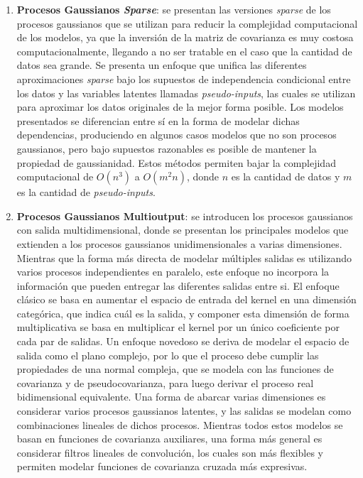 \begin{enumerate}
	\item \textbf{Procesos Gaussianos \textit{Sparse}}: se presentan las versiones \emph{sparse} de los procesos gaussianos que se utilizan para reducir la complejidad computacional de los modelos, ya que la inversión de la matriz de covarianza es muy costosa computacionalmente, llegando a no ser tratable en el caso que la cantidad de datos sea grande. Se presenta un enfoque que unifica las diferentes aproximaciones \emph{sparse} bajo los supuestos de independencia condicional entre los datos y las variables latentes llamadas \emph{pseudo-inputs}, las cuales se utilizan para aproximar los datos originales de la mejor forma posible. Los modelos presentados se diferencian entre sí en la forma de modelar dichas dependencias, produciendo en algunos casos modelos que no son procesos gaussianos, pero bajo supuestos razonables es posible de mantener la propiedad de gaussianidad. Estos métodos permiten bajar la complejidad computacional de \( O\left(n^{3}\right) \) a \( O\left(m^{2} n\right) \), donde \(n\) es la cantidad de datos y \(m\) es la cantidad de \emph{pseudo-inputs}.
	
	\item \textbf{Procesos Gaussianos Multioutput}: se introducen los procesos gaussianos con salida multidimensional, donde se presentan los principales modelos que extienden a los procesos gaussianos unidimensionales a varias dimensiones. Mientras que la forma más directa de modelar múltiples salidas es utilizando varios procesos independientes en paralelo, este enfoque no incorpora la información que pueden entregar las diferentes salidas entre si. El enfoque clásico se basa en aumentar el espacio de entrada del kernel en una dimensión categórica, que indica cuál es la salida, y componer esta dimensión de forma multiplicativa se basa en multiplicar el kernel por un único coeficiente por cada par de salidas. Un enfoque novedoso se deriva de modelar el espacio de salida como el plano complejo, por lo que el proceso debe cumplir las propiedades de una normal compleja, que se modela con las funciones de covarianza y de pseudocovarianza, para luego derivar el proceso real bidimensional equivalente. Una forma de abarcar varias dimensiones es considerar varios procesos gaussianos latentes, y las salidas se modelan como combinaciones lineales de dichos procesos. Mientras todos estos modelos se basan en funciones de covarianza auxiliares, una forma más general es considerar filtros lineales de convolución, los cuales son más flexibles y permiten modelar funciones de covarianza cruzada más expresivas.
	

\end{enumerate}
